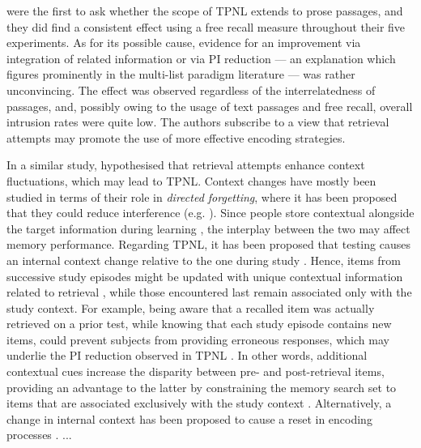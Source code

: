 \documentclass[../main.tex]{subfiles}
\begin{document}
\cite{wissmanInterimTestEffect2011} were the first to ask whether the scope 
of TPNL extends to prose passages, and they did find a consistent effect 
using a free recall measure throughout their five experiments. As for its 
possible cause, evidence for an improvement via integration of related 
information or via PI reduction --- an explanation which figures prominently 
in the multi-list paradigm literature \citep{darleyEffectsPriorFree1971, 
szpunarTestingStudyInsulates2008} --- was rather unconvincing. The effect 
was observed regardless of the interrelatedness of passages, and, possibly 
owing to the usage of text passages and free recall, overall intrusion 
rates were quite low. The authors subscribe to a view that retrieval 
attempts may promote the use of more effective encoding strategies. 

In a similar study, \cite{divisRetrievalSpeedsContext2014} hypothesised that 
retrieval attempts enhance context fluctuations, which may lead to TPNL. 
Context changes have mostly been studied in terms of their role in 
\textit{directed forgetting}, where it has been proposed that they could 
reduce interference (e.g. \citealp{sahakyanContextualChangeAccount2002}). 
Since people store contextual alongside the target information during 
learning \citep{howardDistributedRepresentationTemporal2002,
	tulvingEncodingSpecificityRetrieval1973, 
	mensinkModelInterferenceForgetting1988}, the 
interplay between the two may affect memory performance. Regarding TPNL, it 
has been proposed that testing causes an internal context change relative to 
the one during study \citep{jangContextRetrievalContext2008}. Hence, items 
from successive study episodes might be updated with unique contextual 
information related to retrieval \citep{karpickeRetrievalBasedLearning2014, 
lehmanEpisodicContextAccount2014}, while those encountered last remain 
associated only with the study context. For example, being aware that a 
recalled item was actually retrieved on a prior test, while knowing that 
each study episode contains new items, could prevent subjects from providing 
erroneous responses, which may underlie the PI reduction observed in TPNL 
\citep{szpunarTestingStudyInsulates2008, johnsonSourceMonitoring1993}. In 
other words, additional contextual cues increase the disparity between pre- 
and post-retrieval items, providing an advantage to the latter by 
constraining the memory search set to items that are associated exclusively 
with the study context \citep{szpunarTestingStudyInsulates2008}. 
Alternatively, a change in internal context has been proposed to cause a 
reset in encoding processes 
\citep{pastotterRetrievalLearningFacilitates2011}. ...
\end{document}
